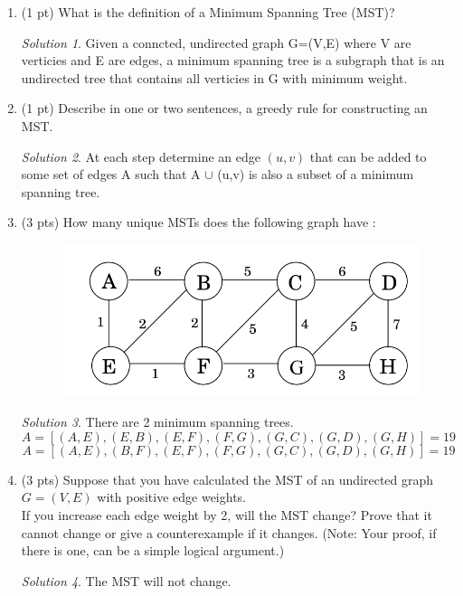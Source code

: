 \documentclass[12pt]{article}
\theoremstyle{remark}
\newtheorem*{solution}{Solution}
\begin{document}
\hrulefill

\newpage
\begin{enumerate}
\item (1 pt) What is the definition of a Minimum Spanning Tree (MST)?
\begin{solution}
Given a conncted, undirected graph G=(V,E) where V are verticies and E are edges, a minimum spanning tree is a subgraph that is an undirected tree that contains all verticies in G with minimum weight.
\end{solution}
\item (1 pt) Describe in one or two sentences, a greedy rule for constructing an MST.
\begin{solution}
At each step determine an edge $(u,v)$ that can be added to some set of edges A such that A $\cup$ (u,v) is also a subset of a minimum spanning tree.
\end{solution}

\item (3 pts) How many unique MSTs does the following graph have :
\begin{figure}[h!]
\begin{center}
\includegraphics[scale=0.3]{mst_graph_q2.jpg} 
\end{center}
\end{figure}


\begin{solution}
There are 2 minimum spanning trees. $$A=[(A,E) ,(E,B), (E,F), (F,G), (G,C), (G,D), (G,H)] =19$$ $$A=[(A,E) ,(B,F), (E,F), (F,G), (G,C), (G,D), (G,H)]=19$$
\end{solution}

\pagebreak
\item (3 pts) Suppose that you have calculated the MST of an undirected graph $G=(V,E)$ with positive edge weights. \\
If you increase each edge weight by 2, will the MST change? Prove that it cannot change or give a counterexample if it changes. (Note: Your proof, if there is one, can be a simple logical argument.)
\begin{solution}
The MST will not change.


\end{solution}
\end{enumerate}
\end{document}
